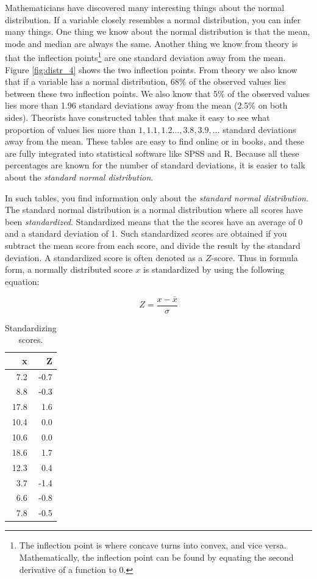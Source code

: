 \documentclass[]{report}\usepackage[]{graphicx}\usepackage[]{color}
\begin{document}
Mathematicians have discovered many interesting things about the normal distribution. If a variable closely resembles a normal distribution, you can infer many things. One thing we know about the normal distribution is that the mean, mode and median are always the same. Another thing we know from theory is that the inflection points\footnote{The inflection point is where concave turns into convex, and vice versa. Mathematically, the inflection point can be found by equating the second derivative of a function to 0.} are one standard deviation away from the mean.  Figure \ref{fig:distr_4} shows the two inflection points. From theory we also know that if a variable has a normal distribution, 68\% of the observed values lies between these two inflection points. We also know that 5\% of the observed values lies more than 1.96 standard deviations away from the mean (2.5\% on both sides). Theorists have constructed tables that make it easy to see what proportion of values lies more than $1, 1.1, 1.2 \dots, 3.8, 3.9, \dots$ standard deviations away from the mean. These tables are easy to find online or in books, and these are fully integrated into statistical software like SPSS and R. Because all these percentages are known for the number of standard deviations, it is easier to talk about the \textit{standard normal distribution}.

In such tables, you find information only about the \textit{standard normal distribution}. The standard normal distribution is a normal distribution where all scores have been \textit{standardized}. Standardized means that the the scores have an average of 0 and a standard deviation of 1. Such standardized scores are obtained if you subtract the mean score from each score, and divide the result by the standard deviation. A standardized score is often denoted as a $Z$-score. Thus in formula form, a normally distributed score $x$ is standardized by using the following equation:


\begin{equation}
Z = \frac{x - \bar{x}}{\sigma}
\end{equation}



\begin{table}[ht]
\centering
\caption{Standardizing scores.} 
\label{tab:normal_1}
\begin{tabular}{rr}
  \hline
x & Z \\ 
  \hline
7.2 & -0.7 \\ 
  8.8 & -0.3 \\ 
  17.8 & 1.6 \\ 
  10.4 & 0.0 \\ 
  10.6 & 0.0 \\ 
  18.6 & 1.7 \\ 
  12.3 & 0.4 \\ 
  3.7 & -1.4 \\ 
  6.6 & -0.8 \\ 
  7.8 & -0.5 \\ 
   \hline
\end{tabular}
\end{table}
\end{document}

